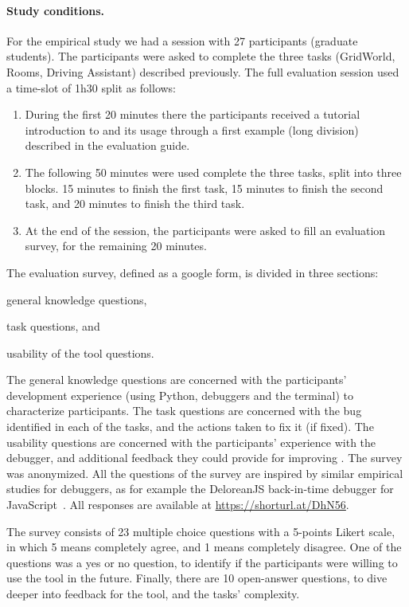 \paragraph{\textbf{Study conditions.}}
For the empirical study we had a session with 27 participants (\ie graduate students). 
The participants were asked to complete the three tasks (\ie GridWorld, Rooms, Driving Assistant) 
described previously. The full evaluation session used a time-slot of 1h30 split as follows: 
\begin{enumerate}[label=\textbf{\arabic*.}]
  \item During the first 20 minutes there the participants received a tutorial introduction to \flik and its 
  usage through a first example (long division) described in the evaluation guide.
  \item The following 50 minutes were used complete the three tasks, split into three blocks. 15 minutes 
  to finish the first task, 15 minutes to finish the second task, and  20 minutes to finish the third task. 
  \item At the end of the session, the participants were asked to fill an evaluation survey, for the 
  remaining 20 minutes. 
\end{enumerate}

The evaluation survey, defined as a google form, is divided in three sections: 
\begin{enumerate*}[label=(\arabic*)]
\item general knowledge questions, 
\item task questions, and 
\item usability of the tool questions.
\end{enumerate*}
The general knowledge questions are concerned with the participants' development experience 
(\ie using Python, debuggers and the terminal) to characterize participants. The task questions are 
concerned with the bug identified in each of the tasks, and the actions taken to fix it (if fixed). The 
usability questions are concerned with the participants' experience with the debugger, and additional 
feedback they could provide for improving \flik. The survey was anonymized. All the questions of the 
survey are inspired by similar empirical studies for debuggers, as for example the DeloreanJS 
back-in-time debugger for JavaScript~\cite{leger23}. All responses are available 
at \url{https://shorturl.at/DhN56}. 

The survey consists of 23 multiple choice questions with a 5-points Likert scale, in which 5 means 
completely agree, and 1 means completely disagree. One of the questions was a yes or no question, 
to identify if the participants were willing to use the tool in the future. Finally, there are 10 open-answer 
questions, to dive deeper into feedback for the tool, and the tasks' complexity.


\endinput

